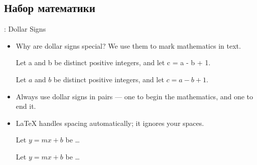 \documentclass{beamer}
\begin{document}
\subsection{Набор математики}
\begin{frame}[fragile]{\insertsubsection{}: Dollar Signs}
\begin{itemize}
\item Why are dollar signs \keystrokebftt{\$} special? We use them to mark mathematics in text.\\[1ex]
\begin{exampletwouptiny}
Let a and b be distinct positive
integers, and let c = a - b + 1.

Let $a$ and $b$ be distinct positive
integers, and let $c = a - b + 1$.
\end{exampletwouptiny}
\item Always use dollar signs in pairs --- one to begin the mathematics, and one
to end it.
\item \LaTeX{} handles spacing automatically; it ignores your spaces.
\begin{exampletwouptiny}
Let $y=mx+b$ be \ldots

Let $y = m x + b$ be \ldots
\end{exampletwouptiny}
\end{itemize}
\end{frame}
\end{document}
